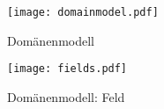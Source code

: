 \FloatBarrier
\begin{figure}[h]
    \centering
    \texttt{[image: domainmodel.pdf]}
    \caption{Domänenmodell}
\end{figure}

\FloatBarrier

\begin{figure}[h]
    \centering
    \texttt{[image: fields.pdf]}
    \caption{Domänenmodell: Feld}
\end{figure}
\FloatBarrier
